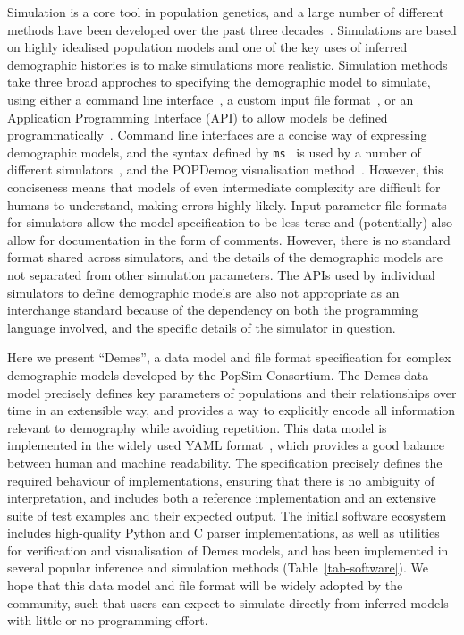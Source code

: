 \documentclass[11pt]{article}
\newcommand{\ms}[0]{\texttt{ms}}
\begin{document}
Simulation is a core tool in population genetics, and a
large number of different methods have been developed
over the past three decades~\citep{carvajal2008simulation,liu2008survey,
arenas2012simulation,yuan2012overview,hoban2012computer}.
Simulations are based on highly idealised population models
and one of the key uses of inferred demographic histories
is to make simulations more realistic.
Simulation methods take three broad approches to specifying
the demographic model to simulate,
using either a command line
interface~\citep[e.g.][]{hudson2002generating,kern2016discoal},
a custom input file
format~\citep[e.g.][]{guillaume2006nemo,excoffier2011fastsimcoal,shlyakhter2014cosi2},
or an Application Programming Interface (API) to allow
models be defined programmatically~\citep[e.g.][]{
thornton2014cpp,kelleher2016efficient,becheler2019quetzal,haller2019slim}.
Command line interfaces are a concise way of expressing
demographic models, and the syntax defined by \ms~\citep{hudson2002generating}
is used by a number of different
simulators~\citep[e.g.][]{ewing2010msms,chen2009fast,staab2015scrm},
and the POPDemog visualisation method~\citep{zhou2018popdemog}.
However, this conciseness means that models of even intermediate complexity
are difficult for humans to understand, making errors highly likely.
Input parameter file formats for simulators allow the model specification
to be less terse and (potentially) also allow for documentation in the
form of comments. However, there is no standard format shared across
simulators, and the details of the demographic models are not separated
from other simulation parameters. The APIs used by individual simulators
to define demographic models are also not appropriate as an interchange
standard because of the dependency on both the programming language involved,
and the specific details of the simulator in question.

Here we present ``Demes'', a data model and file format specification for
complex demographic models developed by the PopSim Consortium. The Demes data
model precisely defines key parameters of populations and their relationships
over time in an extensible way, and provides a way to explicitly encode all
information relevant to demography while avoiding repetition. This data model
is implemented in the widely used YAML format~\citep{ben2009yaml}, which
provides a good balance between human and machine readability. The
specification precisely defines the required behaviour of implementations,
ensuring that there is no ambiguity of interpretation, and includes both a
reference implementation and an extensive suite of test examples and their
expected output. The initial software ecosystem includes high-quality Python
and C parser implementations, as well as utilities for verification and
visualisation of Demes models, and has been implemented in several popular
inference and simulation methods (Table~\ref{tab-software}).  We hope that this
data model and file format will be widely adopted by the community, such that
users can expect to simulate directly from inferred models with little or no
programming effort.
\end{document}
